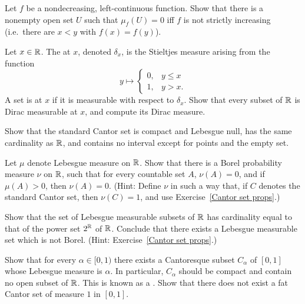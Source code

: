 \begin{exercise}
Let $f$ be a nondecreasing, left-continuous function. Show that there is a nonempty open set $U$ such that $\mu_{f}(U) = 0$ iff $f$ is not strictly increasing (i.e.\ there are $x < y$ with $f(x) = f(y)$).
\end{exercise}

\begin{exercise}\label{Dirac measure}
Let $x \in \mathbb{R}$. The  at $x$, denoted $\delta_{x}$, is the Stieltjes measure arising from the function
\[y \mapsto \begin{cases}
0, &y \leq x\\
1, &y > x.
\end{cases}\]
A set is  at $x$ if it is measurable with respect to $\delta_{x}$.
Show that every subset of $\mathbb{R}$ is Dirac measurable at $x$, and compute its Dirac measure.
\end{exercise}

\begin{exercise}\label{Cantor set props}
Show that the standard Cantor set is compact and Lebesgue null, has the same cardinality as $\mathbb{R}$, and contains no interval except for points and the empty set.
\end{exercise}

\begin{exercise}
Let $\mu$ denote Lebesgue measure on $\mathbb{R}$.
Show that there is a Borel probability measure $\nu$ on $\mathbb{R}$, such that for every countable set $A$, $\nu(A) = 0$, and if $\mu(A) > 0$, then $\nu(A) = 0$.
(Hint: Define $\nu$ in such a way that, if $C$ denotes the standard Cantor set, then $\nu(C) = 1$, and use Exercise~\ref{Cantor set props}.)
\end{exercise}

\begin{exercise}
Show that the set of Lebesgue measurable subsets of $\mathbb{R}$ has cardinality equal to that of the power set $2^{\mathbb{R}}$ of $\mathbb{R}$. Conclude that there exists a Lebesgue measurable set which is not Borel.
(Hint: Exercise~\ref{Cantor set props}.)
\end{exercise}

\begin{exercise}\label{fat cat}
Show that for every $\alpha \in [0, 1)$ there exists a Cantoresque subset $C_{\alpha}$ of $[0, 1]$ whose Lebesgue measure is $\alpha$.
In particular, $C_{\alpha}$ should be compact and contain no open subset of $\mathbb{R}$.
This is known as a .
Show that there does not exist a fat Cantor set of measure $1$ in $[0, 1]$.
\end{exercise}

